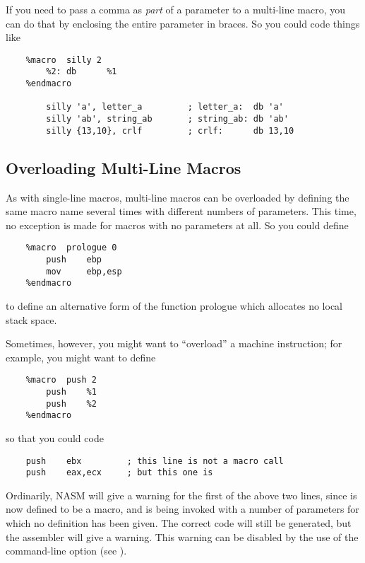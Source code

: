 If you need to pass a comma as \emph{part} of a parameter to a
multi-line macro, you can do that by enclosing the entire parameter
in braces. So you could code
things like

\begin{lstlisting}
    %macro  silly 2
        %2: db      %1
    %endmacro

        silly 'a', letter_a         ; letter_a:  db 'a'
        silly 'ab', string_ab       ; string_ab: db 'ab'
        silly {13,10}, crlf         ; crlf:      db 13,10
\end{lstlisting}

\subsection{Overloading Multi-Line Macros}
\label{subsec:mlmacover}

As with single-line macros, multi-line macros can be overloaded by
defining the same macro name several times with different numbers of
parameters. This time, no exception is made for macros with no
parameters at all. So you could define

\begin{lstlisting}
    %macro  prologue 0
        push    ebp
        mov     ebp,esp
    %endmacro
\end{lstlisting}

to define an alternative form of the function prologue which
allocates no local stack space.

Sometimes, however, you might want to ``overload'' a machine
instruction; for example, you might want to define

\begin{lstlisting}
    %macro  push 2
        push    %1
        push    %2
    %endmacro
\end{lstlisting}

so that you could code

\begin{lstlisting}
    push    ebx         ; this line is not a macro call
    push    eax,ecx     ; but this one is
\end{lstlisting}

Ordinarily, NASM will give a warning for the first of the above two
lines, since  is now defined to be a macro, and is being
invoked with a number of parameters for which no definition has been
given. The correct code will still be generated, but the assembler
will give a warning. This warning can be disabled by the use of the
 command-line option (see ).

